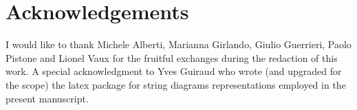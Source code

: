\documentclass[a4paper]{article}
\begin{document}




\section*{Acknowledgements}
I would like to thank Michele Alberti, Marianna Girlando, Giulio Guerrieri, Paolo Pistone and Lionel Vaux for the fruitful exchanges during the redaction of this work. A special acknowledgment to Yves Guiraud  who wrote (and upgraded for the scope) the latex package for string diagrams representations \cite{catex} employed in the present manuscript.

{\small
{}  


}
\end{document}
